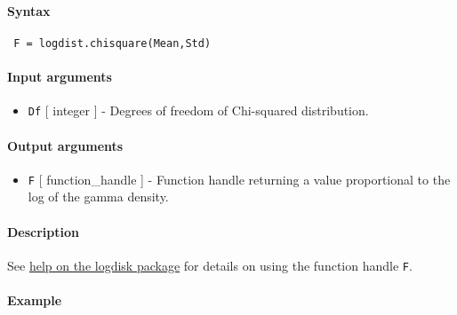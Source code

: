 


	\paragraph{Syntax}
 
 \begin{verbatim}
 F = logdist.chisquare(Mean,Std)
 \end{verbatim}
 
 \paragraph{Input arguments}
 
 \begin{itemize}
 \item
   \texttt{Df} {[} integer {]} - Degrees of freedom of Chi-squared
   distribution.
 \end{itemize}
 
 \paragraph{Output arguments}
 
 \begin{itemize}
 \item
   \texttt{F} {[} function\_handle {]} - Function handle returning a
   value proportional to the log of the gamma density.
 \end{itemize}
 
 \paragraph{Description}
 
 See \href{logdist/Contents}{help on the logdisk package} for details on
 using the function handle \texttt{F}.
 
 \paragraph{Example}


